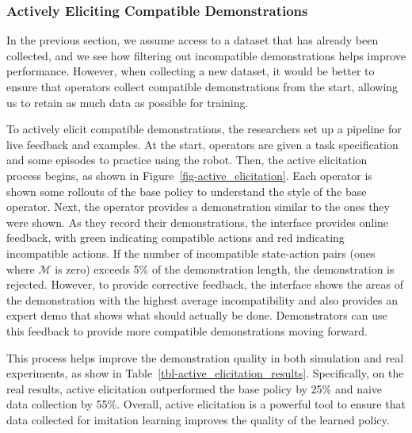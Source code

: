 \documentclass[
  letterpaper,
  numbers=noenddot,
  DIV=11]{scrreprt}
\theoremstyle{definition}
\theoremstyle{plain}
\theoremstyle{plain}
\theoremstyle{remark}
\begin{document}
\subsubsection*{Actively Eliciting Compatible
Demonstrations}\label{actively-eliciting-compatible-demonstrations}

In the previous section, we assume access to a dataset that has already
been collected, and we see how filtering out incompatible demonstrations
helps improve performance. However, when collecting a new dataset, it
would be better to ensure that operators collect compatible
demonstrations from the start, allowing us to retain as much data as
possible for training.

To actively elicit compatible demonstrations, the researchers set up a
pipeline for live feedback and examples. At the start, operators are
given a task specification and some episodes to practice using the
robot. Then, the active elicitation process begins, as shown in
Figure~\ref{fig-active_elicitation}. Each operator is shown some
rollouts of the base policy to understand the style of the base
operator. Next, the operator provides a demonstration similar to the
ones they were shown. As they record their demonstrations, the interface
provides online feedback, with green indicating compatible actions and
red indicating incompatible actions. If the number of incompatible
state-action pairs (ones where \(\mathcal{M}\) is zero) exceeds 5\% of
the demonstration length, the demonstration is rejected. However, to
provide corrective feedback, the interface shows the areas of the
demonstration with the highest average incompatibility and also provides
an expert demo that shows what should actually be done. Demonstrators
can use this feedback to provide more compatible demonstrations moving
forward.

This process helps improve the demonstration quality in both simulation
and real experiments, as show in
Table~\ref{tbl-active_elicitation_results}. Specifically, on the real
results, active elicitation outperformed the base policy by 25\% and
naive data collection by 55\%. Overall, active elicitation is a powerful
tool to ensure that data collected for imitation learning improves the
quality of the learned policy.
\end{document}
